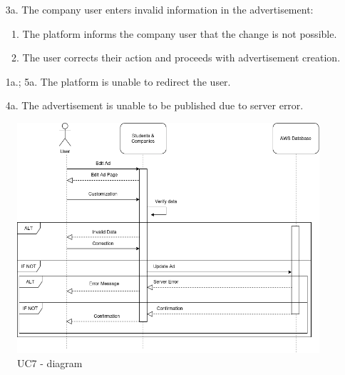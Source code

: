 \begin{itemize}[label={[\textbf{UC}]}, align=left, leftmargin=*]
\begin{enumerate}[label=\arabic*.]
        \item[3a.] The company user enters invalid information in the advertisement:
            \begin{enumerate}[label=\arabic*.]
                \item The platform informs the company user that the change is not possible.
                \item The user corrects their action and proceeds with advertisement creation.
            \end{enumerate}
        \item[1a.; 5a.] The platform is unable to redirect the user.
        \item[4a.] The advertisement is unable to be published due to server error.
        \end{enumerate}

     \begin{figure}[H]
    	\includegraphics[width=\textwidth,height=\textheight,keepaspectratio]{RASD-Latex/assets/Use Case Diagrams/UC7.png}
    	\caption{UC7 - diagram}
    	\label{fig:DataRequest}
    \end{figure}


\end{itemize}
